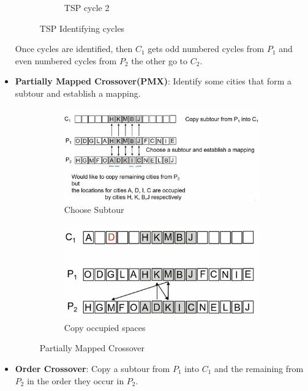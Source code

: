 \documentclass[a4paper]{article}
\begin{document}
\begin{itemize}
\begin{figure}[H]
\begin{subfigure}[b]{0.45\textwidth}
            \caption{TSP cycle 2}
        \end{subfigure}
        \caption{TSP Identifying cycles}
    \end{figure}
    Once cycles are identified, then $C_1$ gets odd numbered cycles from $P_1$ and even numbered cycles from $P_2$ the other go to $C_2$.
    \item \textbf{Partially Mapped Crossover(PMX)}: Identify some cities that form a subtour and establish a mapping.
    \begin{figure}[H]
        \centering
        \begin{subfigure}[b]{0.45\textwidth}
            \centering
            \includegraphics[width=\textwidth]{Degree/static/AI_TSP_partialcrossover_subtour.png}
            \caption{Choose Subtour}
        \end{subfigure}
        \hfill
        \begin{subfigure}[b]{0.45\textwidth}
            \centering
            \includegraphics[width=\textwidth]{Degree/static/AI_TSP_partialcrossover_rest.png}
            \caption{Copy occupied spaces}
        \end{subfigure}
        \caption{Partially Mapped Crossover}
    \end{figure}
    \item \textbf{Order Crossover}: Copy a subtour from $P_1$ into $C_1$ and the remaining from $P_2$ in the order they occur in $P_2$.

\end{itemize}
\end{document}
